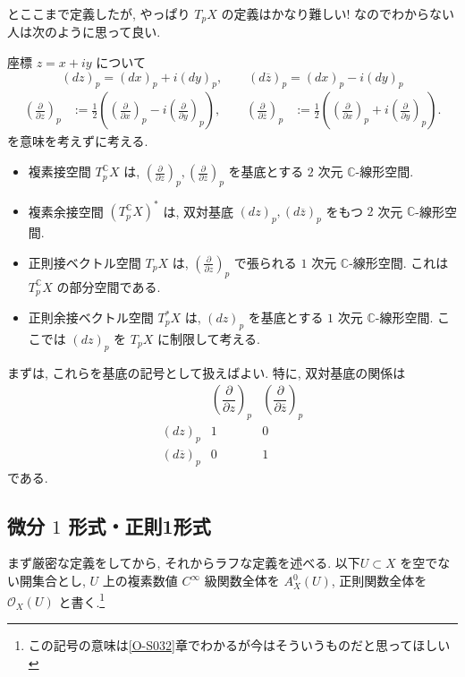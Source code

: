 \documentclass[dvipdfmx,a4paper,11pt]{article} %
\newcommand{\C}{\mathbb{C}}
\theoremstyle{definition}
\numberwithin{equation}{section}
\begin{document}
とここまで定義したが, やっぱり $T_pX$ の定義はかなり難しい!
なのでわからない人は次のように思って良い.
\begin{tcolorbox}[mybox]
座標 $z=x+iy$ について
\[
(dz)_p=(dx)_p+i(dy)_p,\qquad
(d\overline z)_p=(dx)_p-i(dy)_p
\]
\[
\begin{aligned}
\left(\frac{\partial}{\partial z}\right)_p
&:=\frac12\left(
\left(\frac{\partial}{\partial x}\right)_p
-i\left(\frac{\partial}{\partial y}\right)_p\right),
\qquad
\left(\frac{\partial}{\partial\overline z}\right)_p
&:=\frac12\left(
\left(\frac{\partial}{\partial x}\right)_p
+i\left(\frac{\partial}{\partial y}\right)_p\right).
\end{aligned}
\]
を意味を考えずに考える. 
\begin{itemize}
\item 複素接空間 $T_p^{\C}X$ は,
\(
\left(\frac{\partial}{\partial z}\right)_p,
\left(\frac{\partial}{\partial\overline z}\right)_p
\)
を基底とする $2$ 次元 $\C$-線形空間.

\item 複素余接空間 $(T_p^{\C}X)^*$ は,
双対基底
\(
(dz)_p,(d\overline z)_p
\)
をもつ $2$ 次元 $\C$-線形空間.

\item 正則接ベクトル空間 $T_pX$ は,
\(
\left(\frac{\partial}{\partial z}\right)_p
\)
で張られる $1$ 次元 $\C$-線形空間.
これは $T_p^{\C}X$ の部分空間である.

\item 正則余接ベクトル空間 $T_p^*X$ は,
\(
(dz)_p
\)
を基底とする $1$ 次元 $\C$-線形空間.
ここでは $(dz)_p$ を $T_pX$ に制限して考える.
\end{itemize}
まずは, これらを基底の記号として扱えばよい.
特に, 双対基底の関係は
\[
\begin{array}{c|cc}
 & \left(\dfrac{\partial}{\partial z}\right)_p
 & \left(\dfrac{\partial}{\partial\overline z}\right)_p\\ \hline
(dz)_p&1&0\\
(d\overline z)_p&0&1
\end{array}
\]
である.
\end{tcolorbox}

\subsection{微分 $1$ 形式・正則1形式}\label{O-S019}
まず厳密な定義をしてから, それからラフな定義を述べる. 以下$U\subset X$ を空でない開集合とし, $U$ 上の複素数値 $C^\infty$ 級関数全体を
$A_X^0(U)$, 正則関数全体を $\mathcal O_X(U)$ と書く.\footnote{この記号の意味は\ref{O-S032}章でわかるが今はそういうものだと思ってほしい}
\end{document}
